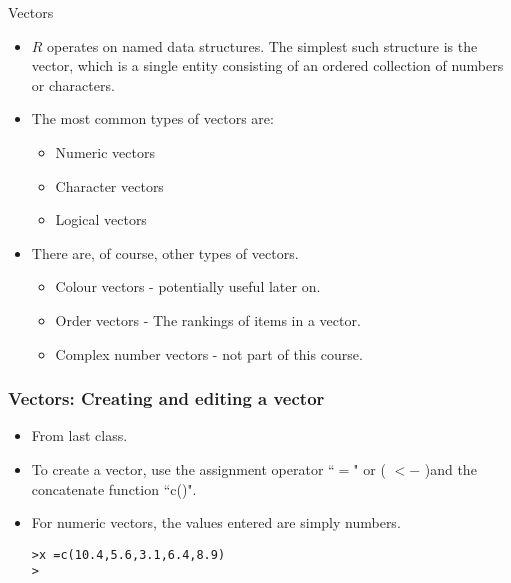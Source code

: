 \documentclass{beamer}
\begin{document}

\begin{frame}[fragile]{Vectors}
\begin{itemize}
\item $R$ operates on named data structures. The simplest such
structure is the vector, which is a single entity consisting of an
ordered collection of numbers or characters.

\item The most common types of vectors are:
\begin{itemize}
\item Numeric vectors \item Character vectors \item Logical
vectors
\end{itemize}

\item There are, of course, other types of vectors.
\begin{itemize}
\item Colour vectors - potentially useful later on.
\item Order vectors - The rankings of items in a vector.
\item Complex number vectors - not part of this course.
\end{itemize}
\end{itemize}
\end{frame}
\begin{frame}[fragile]
\frametitle{Vectors: Creating and editing a vector}
\begin{itemize}
\item From last class.
\item To create a vector, use the assignment operator ``$=$" or ( $<-$ )and
the concatenate function ``c()". \item For numeric vectors, the values
entered are simply numbers.
\begin{framed}
\begin{verbatim}
>x =c(10.4,5.6,3.1,6.4,8.9)
>
\end{verbatim}
\end{framed}
\end{itemize}
\end{frame}
\end{document}
